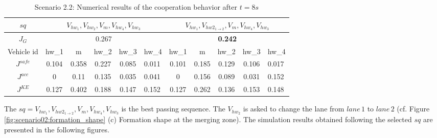 \begin{table}[!h]
\setlength\tabcolsep{6pt} %

\caption{Scenario 2.2: Numerical results of the cooperation behavior after $t=8s$}
\label{Tab: Scenario2.2}

\begin{tabular}{|c|ccccl|ccccl|}
\hline
$sq$       & \multicolumn{5}{c|}{$V_{hw_{1}},V_{hw_{2}},V_{m},V_{hw_{4}}, V_{hw_3}$}                                                                                    & \multicolumn{5}{c|}{$V_{hw_1},V_{hw{2_{1\rightarrow2}}},V_m,V_{hw_4}, V_{hw_3}$}                                                                              \\ \hline
$J_G$      & \multicolumn{5}{c|}{0.267}                                                                                                & \multicolumn{5}{c|}{{\textbf{0.242}}}                                                                              \\ \hline
Vehicle  id    & \multicolumn{1}{c|}{hw_{1}}     & \multicolumn{1}{c|}{m}     & \multicolumn{1}{c|}{hw_{2}}     & \multicolumn{1}{c|}{hw_{3}}      & hw_{4}      & \multicolumn{1}{c|}{hw_{1}}     & \multicolumn{1}{c|}{m}     & \multicolumn{1}{c|}{hw_{2}}     & \multicolumn{1}{c|}{hw_{3}}       & hw_{4}      \\ \hline
$J^{safe}$ & \multicolumn{1}{c|}{0.104} & \multicolumn{1}{c|}{0.358} & \multicolumn{1}{c|}{0.227} & \multicolumn{1}{c|}{0.085} & 0.011 & \multicolumn{1}{c|}{0.101} & \multicolumn{1}{c|}{0.185} & \multicolumn{1}{c|}{0.129} & \multicolumn{1}{c|}{0.106} & 0.017 \\ \hline
$J^{acc}$  & \multicolumn{1}{c|}{0}     & \multicolumn{1}{c|}{0.11}  & \multicolumn{1}{c|}{0.135} & \multicolumn{1}{c|}{0.035} & 0.041 & \multicolumn{1}{c|}{0}     & \multicolumn{1}{c|}{0.156} & \multicolumn{1}{c|}{0.089} & \multicolumn{1}{c|}{0.031} & 0.152 \\ \hline
$J^{KE}$  & \multicolumn{1}{c|}{0.127} & \multicolumn{1}{c|}{0.402} & \multicolumn{1}{c|}{0.188} & \multicolumn{1}{c|}{0.147} & 0.152 & \multicolumn{1}{c|}{0.127} & \multicolumn{1}{c|}{0.262} & \multicolumn{1}{c|}{0.136} & \multicolumn{1}{c|}{0.153} & 0.148 \\ \hline
\end{tabular}
\end{table}

The $sq={V_{hw_1},V_{hw{2_{1\rightarrow2}}},V_m,V_{hw_4}, V_{hw_3}}$ is the best passing sequence. The $V_{hw_2}$ is asked to change the lane from $lane \,1$ to $lane \,2$ (cf. Figure \ref{fig:scenario02:formation_shape} (c) Formation shape at the merging zone). The simulation results obtained following the selected $sq$ are presented in the following figures.

